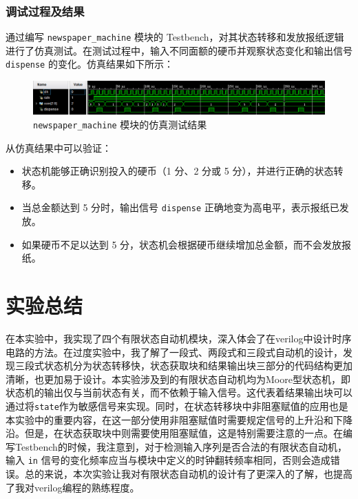\documentclass[zihao=5, UTF8]{article}
\theoremstyle{MyLineTheoremStyle} %
\theoremstyle{MyBlockTheoremStyle} %
\theoremstyle{MySubsubsectionStyle} %
\begin{document}
\subsubsection{调试过程及结果}  
通过编写 \texttt{newspaper\_machine} 模块的 Testbench，对其状态转移和发放报纸逻辑进行了仿真测试。在测试过程中，输入不同面额的硬币并观察状态变化和输出信号 \texttt{dispense} 的变化。仿真结果如下所示：  
\begin{figure}[htbp]  
    \centering  
    \includegraphics[width=\textwidth]{newspaper_machine.png} %
    \caption{\texttt{newspaper\_machine} 模块的仿真测试结果}  
    \label{fig:newspaper_machine_simulation}  
\end{figure}  

从仿真结果中可以验证：  
\begin{itemize}  
    \item 状态机能够正确识别投入的硬币（1 分、2 分或 5 分），并进行正确的状态转移。  
    \item 当总金额达到 5 分时，输出信号 \texttt{dispense} 正确地变为高电平，表示报纸已发放。  
    \item 如果硬币不足以达到 5 分，状态机会根据硬币继续增加总金额，而不会发放报纸。  
\end{itemize}  


\section{实验总结}

在本实验中，我实现了四个有限状态自动机模块，深入体会了在verilog中设计时序电路的方法。在过度实验中，我了解了一段式、两段式和三段式自动机的设计，发现三段式状态机分为状态转移快，状态获取块和结果输出块三部分的代码结构更加清晰，也更加易于设计。本实验涉及到的有限状态自动机均为Moore型状态机，即状态机的输出仅与当前状态有关，而不依赖于输入信号。这代表着结果输出块可以通过将\texttt{state}作为敏感信号来实现。同时，在状态转移块中非阻塞赋值的应用也是本实验中的重要内容，在这一部分使用非阻塞赋值时需要规定信号的上升沿和下降沿。但是，在状态获取块中则需要使用阻塞赋值，这是特别需要注意的一点。在编写Testbench的时候，我注意到，对于检测输入序列是否合法的有限状态自动机，输入 \texttt{in} 信号的变化频率应当与模块中定义的时钟翻转频率相同，否则会造成错误。总的来说，本次实验让我对有限状态自动机的设计有了更深入的了解，也提高了我对verilog编程的熟练程度。
\end{document}

